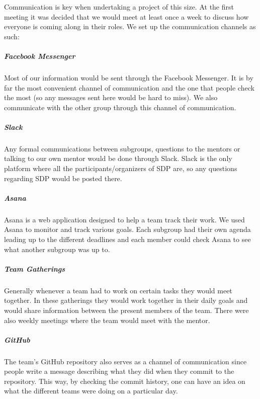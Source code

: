 Communication is key when undertaking a project of this size. At the first meeting it was decided that we would meet at least once a week to discuss how everyone is coming along in their roles. We set up the communication channels as such:

\subparagraph{Facebook Messenger}
Most of our information would be sent through the Facebook Messenger. It is by far the most convenient channel of communication and the one that people check the most (so any messages sent here would be hard to miss). We also communicate with the other group through this channel of communication.
\subparagraph{Slack}
Any formal communications between subgroups, questions to the mentors or talking to our own mentor would be done through Slack. Slack is the only platform where all the participants/organizers of SDP are, so any questions regarding SDP would be posted there.
\subparagraph{Asana}
Asana is a web application designed to help a team track their work.
We used Asana to monitor and track various goals. Each subgroup had their own agenda leading up to the different deadlines and each member could check Asana to see what another subgroup was up to.
\subparagraph{Team Gatherings}
Generally whenever a team had to work on certain tasks they would meet together. In these gatherings they would work together in their daily goals and would share information between the present members of the team. There were also weekly meetings where the team would meet with the mentor.
\subparagraph{GitHub}
The team's GitHub repository also serves as a channel of communication since people write a message describing what they did when they commit to the repository. This way, by checking the commit history, one can have an idea on what the different teams were doing on a particular day.